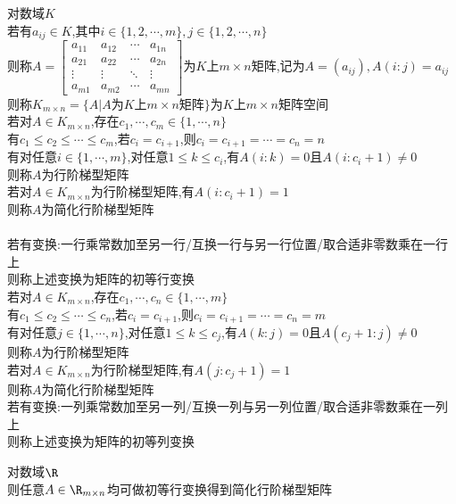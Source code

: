 \begin{dingyi}
对数域$K$\\
若有$a_{ij}\in K$,其中$i\in\{1,2,\cdots,m\},j\in\{1,2,\cdots,n\}$\\
则称$A=\begin{bmatrix}a_{11} & a_{12} & \cdots & a_{1n}\\ a_{21} & a_{22} & \cdots & a_{2n}\\ \vdots & \vdots & \ddots & \vdots\\ a_{m1} & a_{m2} & \cdots & a_{mn} \end{bmatrix}$为$K$上$m\times n$矩阵,记为$A=(a_{ij}),A(i:j)=a_{ij}$\\
则称$K_{m\times n}=\{A|A\text{为}K\text{上}m\times n\text{矩阵}\}$为$K$上$m\times n$矩阵空间\\
若对$A\in K_{m\times n}$,存在$c_{1},\cdots,c_{m}\in \{1,\cdots,n\}$\\
有$c_{1}\leq c_{2}\leq \cdots\leq c_{m}$,若$c_{i}=c_{i+1}$,则$c_{i}=c_{i+1}=\cdots=c_{n}=n$\\
有对任意$i\in\{1,\cdots,m\}$,对任意$1\leq k \leq c_{i}$,有$A(i:k)=0$且$A(i:c_{i}+1)\neq 0$\\
则称$A$为行阶梯型矩阵\\
若对$A\in K_{m\times n}$为行阶梯型矩阵,有$A(i:c_{i}+1)=1$\\
则称$A$为简化行阶梯型矩阵\\
\ \\
若有变换:一行乘常数加至另一行/互换一行与另一行位置/取合适非零数乘在一行上\\
则称上述变换为矩阵的初等行变换\\
若对$A\in K_{m\times n}$,存在$c_{1},\cdots,c_{n}\in \{1,\cdots,m\}$\\
有$c_{1}\leq c_{2}\leq \cdots\leq c_{n}$,若$c_{i}=c_{i+1}$,则$c_{i}=c_{i+1}=\cdots=c_{n}=m$\\
有对任意$j\in\{1,\cdots,n\}$,对任意$1\leq k \leq c_{j}$,有$A(k:j)=0$且$A(c_{j}+1:j)\neq 0$\\
则称$A$为行阶梯型矩阵\\
若对$A\in K_{m\times n}$为行阶梯型矩阵,有$A(j:c_{j}+1)=1$\\
则称$A$为简化行阶梯型矩阵\\
若有变换:一列乘常数加至另一列/互换一列与另一列位置/取合适非零数乘在一列上\\
则称上述变换为矩阵的初等列变换
\end{dingyi}

\begin{dingli}
对数域$\R$\\
则任意$A\in \R_{m\times n}$均可做初等行变换得到简化行阶梯型矩阵
\end{dingli}

